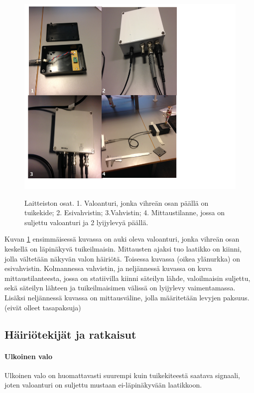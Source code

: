 \documentclass[a4paper, 12pt]{article}
\begin{document}
\begin{figure}[!hbt]
\includegraphics[scale=0.9]{LaitteistonOsat}
\label{fig:LaitteistonOsat}
\caption{Laitteiston osat. 1. Valoanturi, jonka vihreän osan päällä on tuikekide; 2. Esivahvistin; 3.Vahvistin; 4. Mittaustilanne, jossa on suljettu valoanturi ja 2 lyijylevyä päällä.}
\end{figure}

Kuvan \ref{fig:LaitteistonOsat} ensimmäisessä kuvassa on auki oleva valoanturi, jonka vihreän osan keskellä on läpinäkyvä tuikeilmaisin. Mittausten ajaksi tuo laatikko on kiinni, jolla vältetään näkyvän valon häiriötä. Toisessa kuvassa (oikea ylänurkka) on esivahvistin. Kolmannessa vahvistin, ja neljännessä kuvassa on kuva mittaustilanteesta, jossa on statiivilla kiinni säteilyn lähde, valoilmaisin suljettu, sekä säteilyn lähteen ja tuikeilmaisimen välissä on lyijylevy vaimentamassa. Lisäksi neljännessä kuvassa on mittausväline, jolla määritetään levyjen paksuus. (eivät olleet tasapaksuja)

\subsection*{Häiriötekijät ja ratkaisut}
\paragraph{Ulkoinen valo\\}
Ulkoinen valo on huomattavasti suurempi kuin tuikekiteestä saatava signaali, joten valoanturi on suljettu mustaan ei-läpinäkyvään laatikkoon.
\end{document}
